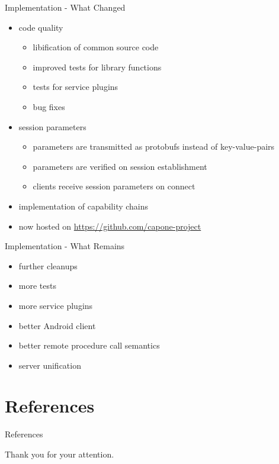 \documentclass[a4paper]{beamer}
\begin{document}
\begin{frame}{Implementation - What Changed}
    \begin{itemize}
        \item code quality
            \begin{itemize}
                \item libification of common source code
                \item improved tests for library functions
                \item tests for service plugins
                \item bug fixes
            \end{itemize}
        \item session parameters
            \begin{itemize}
                \item parameters are transmitted as protobufs instead of key-value-pairs
                \item parameters are verified on session establishment
                \item clients receive session parameters on connect
            \end{itemize}
        \item implementation of capability chains
        \item now hosted on \url{https://github.com/capone-project}
    \end{itemize}
\end{frame}

\begin{frame}{Implementation - What Remains}
    \begin{itemize}
        \item further cleanups
        \item more tests
        \item more service plugins
        \item better Android client
        \item better remote procedure call semantics
        \item server unification
    \end{itemize}
\end{frame}

\section{References}

\begin{frame}[allowframebreaks]{References}
    
    {\Tiny }
\end{frame}

\begin{frame}[plain]
    \begin{center}
        Thank you for your attention.
    \end{center}
\end{frame}
\end{document}
